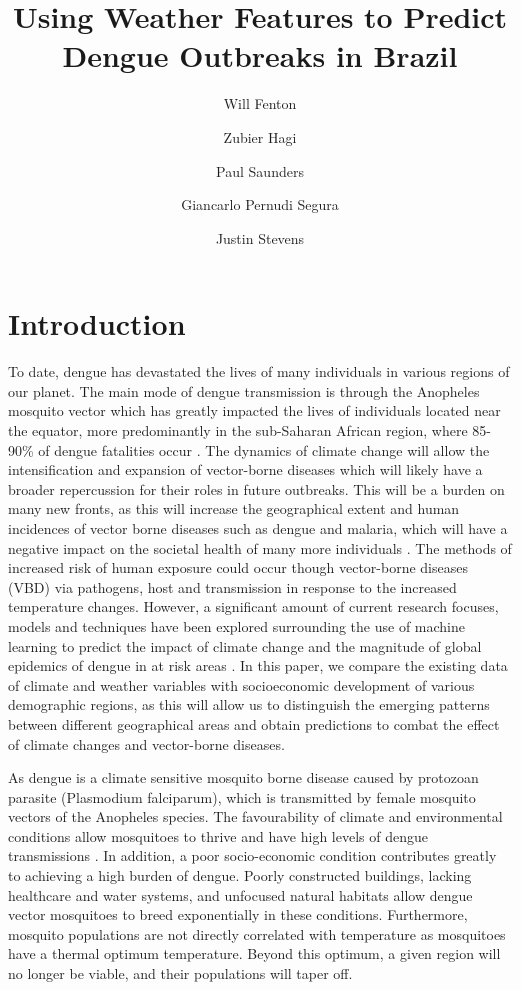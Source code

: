 \documentclass[11pt]{article}
\title{Using Weather Features to Predict Dengue Outbreaks in Brazil}
\author{Will Fenton}
\author{Zubier Hagi}
\author{Paul Saunders}
\author{Giancarlo Pernudi Segura}
\author{Justin Stevens}
\affil{University of Alberta}
\begin{document}
\maketitle

\section{Introduction}
To date, dengue has devastated the lives of many individuals in various regions of our planet. The main mode of dengue transmission is through the Anopheles mosquito vector which has greatly impacted the lives of individuals located near the equator, more predominantly in the sub-Saharan African region, where 85-90\% of dengue fatalities occur \cite{snow2005global}. The dynamics of climate change will allow the intensification and expansion of vector-borne diseases which will likely have a broader repercussion for their roles in future outbreaks. This will be a burden on many new fronts, as this will increase the geographical extent and human incidences of vector borne diseases such as dengue and malaria, which will have a negative impact on the societal health of many more individuals \cite{ryan2019global}. The methods of increased risk of human exposure could occur though vector-borne diseases (VBD) via pathogens, host and transmission in response to the increased temperature changes. However, a significant amount of current research focuses, models and techniques have been explored surrounding the use of machine learning to predict the impact of climate change and the magnitude of global epidemics of dengue in at risk areas \cite{laneri2019climate}\cite{li2019climate}\cite{caminade2014impact}. In this paper, we compare the existing data of climate and weather variables with socioeconomic development of various demographic regions, as this will allow us to distinguish the emerging patterns between different geographical areas and obtain predictions to combat the effect of climate changes and vector-borne diseases.

As dengue is a climate sensitive mosquito borne disease caused by protozoan parasite (Plasmodium falciparum), which is transmitted by female mosquito vectors of the Anopheles species. The favourability of climate and environmental conditions allow mosquitoes to thrive and have high levels of dengue transmissions \cite{arrow2004parasite}. In addition, a poor socio-economic condition contributes greatly to achieving a high burden of dengue. Poorly constructed buildings, lacking healthcare and water systems, and unfocused natural habitats allow dengue vector mosquitoes to breed exponentially in these conditions. Furthermore, mosquito populations are not directly correlated with temperature as mosquitoes have a thermal optimum temperature. Beyond this optimum, a given region will no longer be viable, and their populations will taper off.
\end{document}

